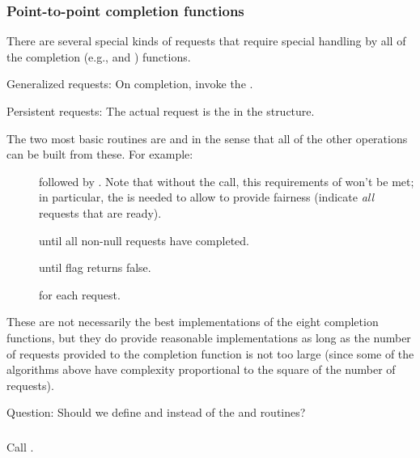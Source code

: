 \documentclass{article}
\begin{document}
\subsubsection{Point-to-point completion functions}
There are several special kinds of requests that require special handling by
all of the completion (e.g.,  and )
functions. 

Generalized requests:  On completion, invoke the
. 

Persistent requests: The actual request is the
 in the
 structure.

The two most basic routines are  and
 in the sense that all of the other operations
can be built from these.  For example:
\begin{description}
\item[]
\item[] followed by
.  Note that without the 
call, this requirements of  won't be met; in
particular, the  is needed to allow
 to provide fairness (indicate \emph{all}
requests that are ready).
\item[] until all non-null
requests have completed.
\item[]
\item[] until flag returns
false.
\item[] for each request.
\end{description}
These are not necessarily the best implementations of the eight
completion functions, but they do provide reasonable implementations
as long as the number of requests provided to the completion function
is not too large (since some of the algorithms above have complexity
proportional to the square of the number of requests).

Question:  Should we define  and
 instead of the  and
 routines?

\subsubsection{}
Call .
\end{document}
